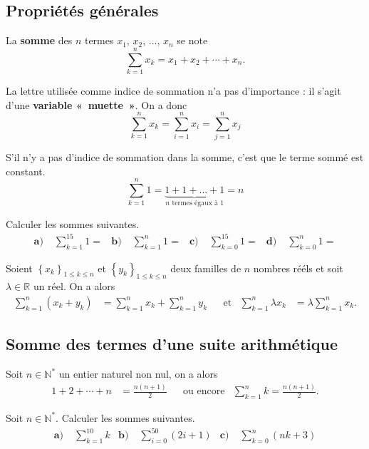 \documentclass[11pt]{article}
\begin{document}
\subsection{Propriétés générales}
\begin{notation}
  La \textbf{somme} des $n$ termes $x_1$, $x_2$, $\dots$, $x_n$ se note
  \[
    \sum_{k=1}^n x_k = x_1 + x_2 + \cdots + x_n.
  \]
\end{notation}
\begin{rmq}
  La lettre utilisée comme indice de sommation n'a pas d'importance : il s'agit
  d'une \textbf{variable «~muette~»}. On a donc
  \[
    \sum_{k=1}^n x_k =
    \sum_{i=1}^n x_i =
    \sum_{j=1}^n x_j
  \]
\end{rmq}
\begin{prop}
S'il n'y a pas d'indice de sommation dans la somme, c'est que le terme sommé
est constant.
  \[
    \sum_{k=1}^{n} 1 = \underbrace{1+1+\dots+1}_{n\text{ termes égaux à }1} = n
  \]
\end{prop}
\begin{app}
  Calculer les sommes suivantes.
  \begin{align*}
    \textbf{a)}\; & \sum_{k=1}^{15} 1 = &
    \textbf{b)}\; & \sum_{k=1}^{n} 1 = &
    \textbf{c)}\; & \sum_{k=0}^{15} 1 = &
    \textbf{d)}\; & \sum_{k=0}^{n} 1 =
  \end{align*}
\end{app}
\begin{prop}
  Soient $\left\{ x_k \right\}_{1\leq k \leq n}$ et $\left\{ y_k \right\}_{1\leq
  k \leq n}$ deux familles de $n$ nombres rééls et soit $\lambda\in\mathbb{R}$
  un réel. On a alors
  \begin{align*}
    \sum_{k=1}^n\left( x_k+y_k \right) &= \sum_{k=1}^nx_k+\sum_{k=1}^ny_k &
    &\text{et}&
    \sum_{k=1}^n\lambda x_k &= \lambda\sum_{k=1}^nx_k.
  \end{align*}
\end{prop}
\subsection{Somme des termes d'une suite arithmétique}
\begin{thm}
  Soit $n\in\mathbb{N}^*$ un entier naturel non nul, on a alors
  \begin{align*}
    1+2+\cdots+n &= \frac{n(n+1)}{2} &
    &\text{ou encore} &
    \sum_{k=1}^n k = \frac{n(n+1)}{2}.
  \end{align*}
\end{thm}
\begin{app}
  Soit $n\in\mathbb{N}^*$. Calculer les sommes suivantes.
  \begin{align*}
    \textbf{a)}\;& \sum_{k=1}^{10} k &
    \textbf{b)}\;& \sum_{i=0}^{50} \left( 2i+1 \right) &
    \textbf{c)}\;& \sum_{k=0}^{n} (nk+3)
  \end{align*}
\end{app}
\end{document}
